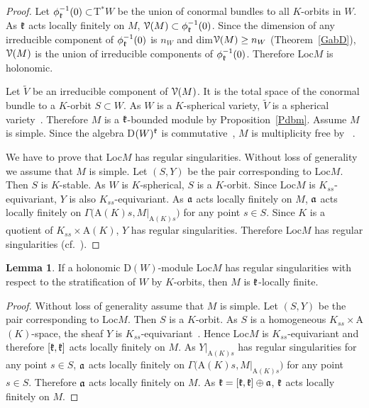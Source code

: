 \documentclass[12pt]{amsart}
\theoremstyle{definition}\newtheorem{theorem}{Theorem}[section]
\newtheorem{lemma}[proposition]{Lemma}
\theoremstyle{definition}\newtheorem{definition}[proposition]{Definition}
\theoremstyle{remark}\newtheorem{example}[proposition]{Example}
\begin{document}
\begin{proof}Let $\phi^{-1}_\frak k(0)\subset$T$^*W$ be the union of conormal bundles to all $K$-orbits in $W$. As $\frak k$ acts locally finitely on $M$, $\EuScript V(M)\subset\phi^{-1}_\frak k(0)$. Since the dimension of any irreducible component of $\phi^{-1}_\frak k(0)$ is $n_W$ and dim$\EuScript V(M)\ge n_W$ (Theorem~\ref{GabD}), $\EuScript V(M)$ is the union of irreducible components of $\phi^{-1}_\frak k(0)$. Therefore Loc$M$ is holonomic.

Let $\tilde V$ be an irreducible component of $\EuScript V(M)$. It is the total space of the conormal bundle to a $K$-orbit $S\subset W$. As $W$ is a $K$-spherical variety, $\tilde V$ is a spherical variety~\cite{Pan}. Therefore $M$ is a $\frak k$-bounded module by Proposition~\ref{Pdbm}. Assume $M$ is simple. Since the algebra D$(W)^\frak k$ is commutative~\cite{Kn}, $M$ is multiplicity free by ~\cite[Corollary~5.8]{PS2}.

We have to prove that Loc$M$ has regular singularities. Without loss of generality we assume that $M$ is simple. Let $(S, Y)$ be the pair corresponding to Loc$M$. Then $S$ is $K$-stable. As $W$ is $K$-spherical, $S$ is a $K$-orbit.  Since Loc$M$ is $K_{ss}$-equivariant, $Y$ is also $K_{ss}$-equivariant. As $\frak a$ acts locally finitely on $M$, $\frak a$ acts  locally finitely on $\Gamma($A$(K)s, M|_{\mathrm A(K)s})$ for any point $s\in S$. Since $K$ is a quotient of $K_{ss}\times$A$(K)$, $Y$ has regular singularities. Therefore Loc$M$ has regular singularities (cf.~\cite[12.11]{Bo}).\end{proof}
\begin{lemma}If a holonomic D$(W)$-module Loc$M$ has regular singularities with respect to the stratification of $W$ by $K$-orbits, then $M$ is $\frak k$-locally finite.\end{lemma}
\begin{proof}Without loss of generality assume that $M$ is simple. Let $(S, Y)$ be the pair corresponding to Loc$M$. Then $S$ is a $K$-orbit. As $S$ is a homogeneous $K_{ss}\times$A$(K)$-space, the sheaf $Y$ is $K_{ss}$-equivariant~\cite[12.11]{Bo}. Hence Loc$M$ is $K_{ss}$-equivariant and therefore $[\frak k, \frak k]$ acts locally finitely on $M$. As $Y|_{\mathrm A(K)s}$ has regular singularities for any point $s\in S$, $\frak a$ acts locally finitely on $\Gamma($A$(K)s, M|_{\mathrm A(K)s})$ for any point $s\in S$. Therefore $\frak a$ acts locally finitely on $M$. As $\frak k=[\frak k, \frak k]\oplus\frak a$, $\frak k$ acts locally finitely on $M$.\end{proof}
\end{document}
